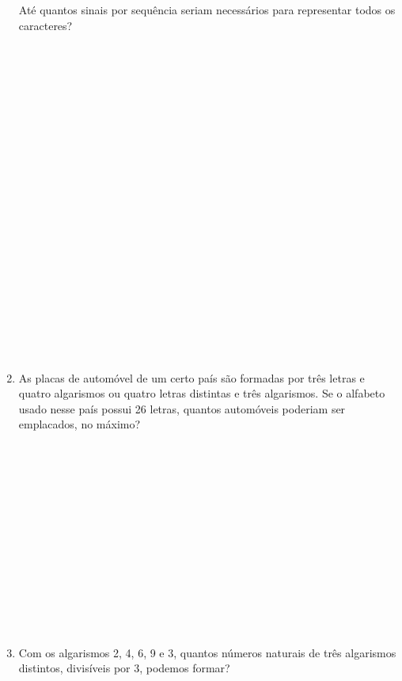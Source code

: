 \documentclass[a4paper,14pt]{article}
\begin{document}
\begin{multicols}{2}
\begin{enumerate}
			Até quantos sinais por sequência seriam necessários para representar todos os caracteres? \\\\\\\\\\\\\\\\\\\\\\\\\\\\\\\\\\\\\\\\\\\\
			\item As placas de automóvel de um certo país são formadas por três letras e quatro algarismos ou quatro letras distintas e três algarismos. Se o alfabeto usado nesse país possui 26 letras, quantos automóveis poderiam ser emplacados, no máximo? \\\\\\\\\\\\\\\\\\\\\\\\\\\\
			\item Com os algarismos 2, 4, 6, 9 e 3, quantos números naturais de três algarismos distintos, divisíveis por 3, podemos formar? \\\\\\\\\\\\\\\\\\\\\\\\\\\\

\end{enumerate}
\end{multicols}
\end{document}
